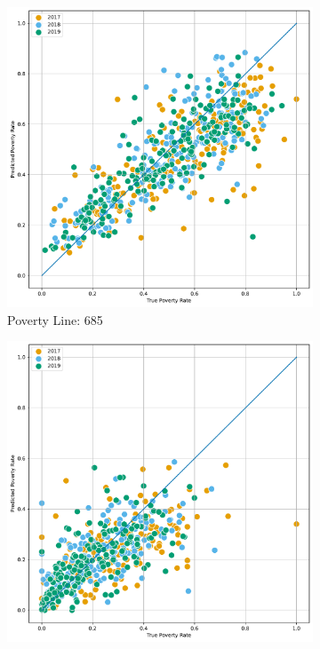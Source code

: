 \begin{figure}[H]
    \caption{Correlation: Predicted Poverty against true by Province}
    \centering
         \centering
         \begin{subfigure}[b]{0.47\textwidth}
             \centering
             \includegraphics[width=\textwidth]{../figures/fig4_2_prediction_vs_true_poverty_rate_provincia_p685_scatter.pdf}
             \caption{Poverty Line: 685}
         \end{subfigure}
         \hfill
         \begin{subfigure}[b]{0.47\textwidth}
             \centering
             \includegraphics[width=\textwidth]{../figures/fig4_2_prediction_vs_true_poverty_rate_provincia_p365_scatter.pdf}

\end{subfigure}
\end{figure}
